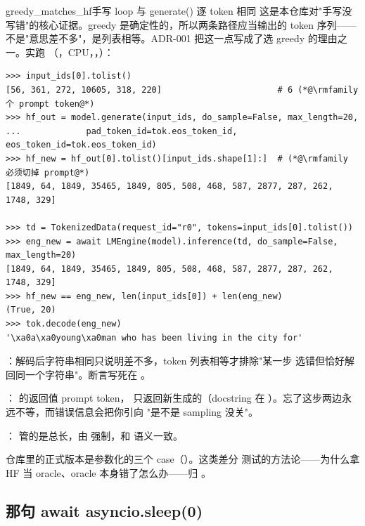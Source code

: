 \begin{examplebox}{greedy_matches_hf}{手写 loop 与 generate() 逐 token 相同}
这是本仓库对"手写没写错"的核心证据。greedy 是确定性的，所以两条路径应当输出的
token 序列——不是"意思差不多"，是列表相等。ADR-001 把这一点写成了选 greedy 的理由之一。实跑
（，CPU，，）：

\begin{lstlisting}[style=hlrepl]
>>> input_ids[0].tolist()
[56, 361, 272, 10605, 318, 220]                       # 6 (*@\rmfamily 个 prompt token@*)
>>> hf_out = model.generate(input_ids, do_sample=False, max_length=20,
...             pad_token_id=tok.eos_token_id, eos_token_id=tok.eos_token_id)
>>> hf_new = hf_out[0].tolist()[input_ids.shape[1]:]  # (*@\rmfamily 必须切掉 prompt@*)
[1849, 64, 1849, 35465, 1849, 805, 508, 468, 587, 2877, 287, 262, 1748, 329]

>>> td = TokenizedData(request_id="r0", tokens=input_ids[0].tolist())
>>> eng_new = await LMEngine(model).inference(td, do_sample=False, max_length=20)
[1849, 64, 1849, 35465, 1849, 805, 508, 468, 587, 2877, 287, 262, 1748, 329]
>>> hf_new == eng_new, len(input_ids[0]) + len(eng_new)
(True, 20)
>>> tok.decode(eng_new)
'\xa0a\xa0young\xa0man who has been living in the city for'
\end{lstlisting}

：解码后字符串相同只说明差不多，token 列表相等才排除"某一步
选错但恰好解回同一个字符串"。断言写死在 。

： 的返回值 prompt token，
 只返回新生成的（docstring 在
）。忘了这步两边永远不等，而错误信息会把你引向
"是不是 sampling 没关"。

： 管的是总长，由
 强制，和  语义一致。

仓库里的正式版本是参数化的三个 case（）。这类差分
测试的方法论——为什么拿 HF 当 oracle、oracle 本身错了怎么办——归 。
\end{examplebox}

\subsection{那句 await asyncio.sleep(0)}
\label{sec:a-loop-weak-async}

